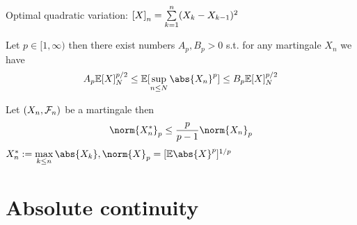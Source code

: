 \newpage
Optimal quadratic variation: $\left[{X} \right]_n = \sum\limits_{k=1}^n (X_k -X_{k-1})^2$
\begin{thm}
\label{BDG}
Let $p\in [1,\infty)$ then there exist numbers $A_p, B_p > 0$ s.t. for any martingale $X_n$ we have 
\begin{equation*}
    A_p\E [X]_N^{p/2} \leq \E[\supunder{n\leq N}\abs{X_n}^p] \leq B_p \E [X]_N^{p/2}
\end{equation*}
\end{thm}

\begin{thm}
Let $(X_n, \mathcal{F}_n)$ be a martingale then \begin{equation*}
    \norm{X_n^*}_p \leq \frac{p}{p-1} \norm{X_n}_p
\end{equation*}$X_n^*:= \max\limits_{k\leq n} \abs{X_k}, \norm{X}_p = [\E\abs{X}^p]^{1/p}$
\end{thm}


\newpage
\section{Absolute continuity}

